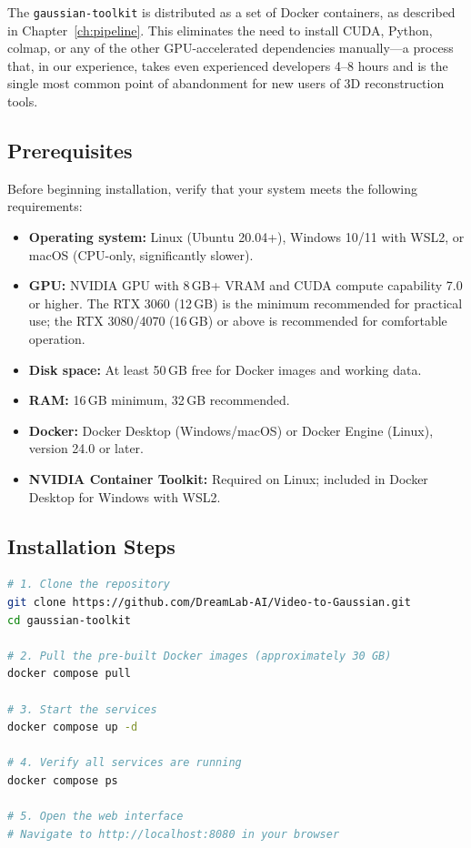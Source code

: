 The \texttt{gaussian-toolkit} is distributed as a set of Docker containers, as described in Chapter~\ref{ch:pipeline}. This eliminates the need to install CUDA, Python, \acrshort{colmap}, or any of the other GPU-accelerated dependencies manually---a process that, in our experience, takes even experienced developers 4--8 hours and is the single most common point of abandonment for new users of 3D reconstruction tools.

\subsection{Prerequisites}

Before beginning installation, verify that your system meets the following requirements:

\begin{itemize}
  \item \textbf{Operating system:} Linux (Ubuntu 20.04+), Windows 10/11 with WSL2, or macOS (CPU-only, significantly slower).
  \item \textbf{GPU:} NVIDIA GPU with 8\,GB+ VRAM and CUDA compute capability 7.0 or higher. The RTX 3060 (12\,GB) is the minimum recommended for practical use; the RTX 3080/4070 (16\,GB) or above is recommended for comfortable operation.
  \item \textbf{Disk space:} At least 50\,GB free for Docker images and working data.
  \item \textbf{RAM:} 16\,GB minimum, 32\,GB recommended.
  \item \textbf{Docker:} Docker Desktop (Windows/macOS) or Docker Engine (Linux), version 24.0 or later.
  \item \textbf{NVIDIA Container Toolkit:} Required on Linux; included in Docker Desktop for Windows with WSL2.
\end{itemize}

\subsection{Installation Steps}

\begin{lstlisting}[language=bash, caption={Installing the \texttt{gaussian-toolkit}.}, label={lst:install}]
# 1. Clone the repository
git clone https://github.com/DreamLab-AI/Video-to-Gaussian.git
cd gaussian-toolkit

# 2. Pull the pre-built Docker images (approximately 30 GB)
docker compose pull

# 3. Start the services
docker compose up -d

# 4. Verify all services are running
docker compose ps

# 5. Open the web interface
# Navigate to http://localhost:8080 in your browser
\end{lstlisting}

